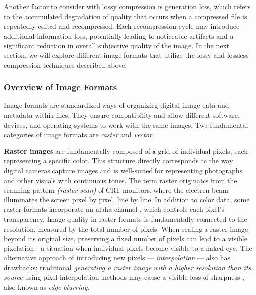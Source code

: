 
Another factor to consider with lossy compression is generation loss, which refers to the accumulated degradation of quality that occurs when a compressed file is repeatedly edited and recompressed. Each recompression cycle may introduce additional information loss, potentially leading to noticeable artifacts and a significant reduction in overall subjective quality of the image. In the next section, we will explore different image formats that utilize the lossy and lossless compression techniques described above.


\subsubsection{Overview of Image Formats}
\label{sec:raster-and-vector-graphics}

Image formats are standardized ways of organizing digital image data and metadata within files. They ensure compatibility and allow different software, devices, and operating systems to work with the same images. Two fundamental categories of image formats are \emph{raster} and \emph{vector}.

\textbf{Raster images} \cite{foley1996computer-graphics} are fundamentally composed of a grid of individual pixels, each representing a specific color. This structure directly corresponds to the way digital cameras capture images and is well-suited for representing photographs and other visuals with continuous tones. The term raster originates from the scanning pattern \emph{(raster scan)} of CRT monitors, where the electron beam illuminates the screen pixel by pixel, line by line. In addition to color data, some raster formats incorporate an alpha channel \cite{porter1984compositing-ditigal-images}, which controls each pixel's transparency. Image quality in raster formats is fundamentally connected to the resolution, measured by the total number of pixels. When scaling a raster image beyond its original size, preserving a fixed number of pixels can lead to a visible pixelation - a situation when individual pixels become visible to a naked eye. The alternative approach of introducing new pixels --- \emph{interpolation} \cite{han2013comparison-interpolation-methods} --- also has drawbacks: traditional \emph{generating a raster image with a higher resolution than its source} using pixel interpolation methods may cause a visible loss of sharpness \cite{van2006image-super-resolution}, also known as \emph{edge blurring}.

